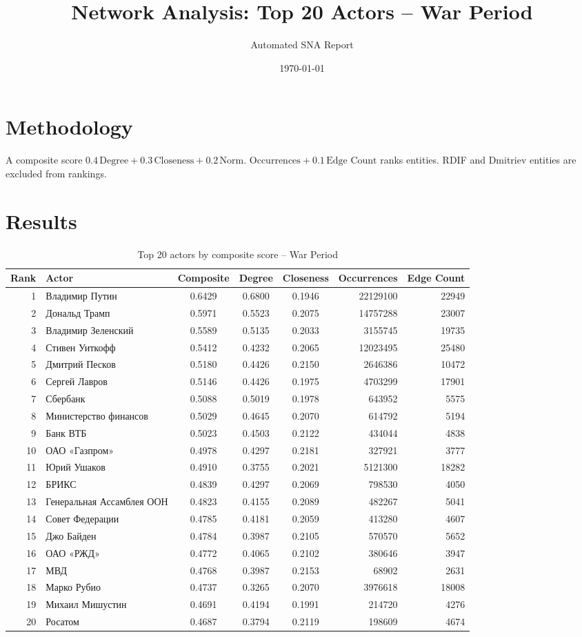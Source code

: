 \documentclass[11pt,a4paper]{article}
\title{Network Analysis: Top 20 Actors -- War Period}
\author{Automated SNA Report}
\date{\today}
\begin{document}
\maketitle
\section{Methodology}
A composite score $0.4\,\text{Degree}+0.3\,\text{Closeness}+0.2\,\text{Norm.\ Occurrences}+0.1\,\text{Edge Count}$ ranks entities. RDIF and Dmitriev entities are excluded from rankings.
\section{Results}
\begin{table}[htbp]
\centering
\caption{Top 20 actors by composite score -- War Period}
\label{tab:top20}
\begin{tabular}{r l S[table-format=1.4] S[table-format=1.4] S[table-format=1.4] r r}
\toprule
Rank & Actor & {Composite} & {Degree} & {Closeness} & Occurrences & {Edge Count}\\
 & Владимир Путин & 0.6429 & 0.6800 & 0.1946 & 22129100 & 22949 \\
2 & Дональд Трамп & 0.5971 & 0.5523 & 0.2075 & 14757288 & 23007 \\
3 & Владимир Зеленский & 0.5589 & 0.5135 & 0.2033 & 3155745 & 19735 \\
4 & Стивен Уиткофф & 0.5412 & 0.4232 & 0.2065 & 12023495 & 25480 \\
5 & Дмитрий Песков & 0.5180 & 0.4426 & 0.2150 & 2646386 & 10472 \\
6 & Сергей Лавров & 0.5146 & 0.4426 & 0.1975 & 4703299 & 17901 \\
7 & Сбербанк & 0.5088 & 0.5019 & 0.1978 & 643952 & 5575 \\
8 & Министерство финансов & 0.5029 & 0.4645 & 0.2070 & 614792 & 5194 \\
9 & Банк ВТБ & 0.5023 & 0.4503 & 0.2122 & 434044 & 4838 \\
10 & ОАО «Газпром» & 0.4978 & 0.4297 & 0.2181 & 327921 & 3777 \\
11 & Юрий Ушаков & 0.4910 & 0.3755 & 0.2021 & 5121300 & 18282 \\
12 & БРИКС & 0.4839 & 0.4297 & 0.2069 & 798530 & 4050 \\
13 & Генеральная Ассамблея ООН & 0.4823 & 0.4155 & 0.2089 & 482267 & 5041 \\
14 & Совет Федерации & 0.4785 & 0.4181 & 0.2059 & 413280 & 4607 \\
15 & Джо Байден & 0.4784 & 0.3987 & 0.2105 & 570570 & 5652 \\
16 & ОАО «РЖД» & 0.4772 & 0.4065 & 0.2102 & 380646 & 3947 \\
17 & МВД & 0.4768 & 0.3987 & 0.2153 & 68902 & 2631 \\
18 & Марко Рубио & 0.4737 & 0.3265 & 0.2070 & 3976618 & 18008 \\
19 & Михаил Мишустин & 0.4691 & 0.4194 & 0.1991 & 214720 & 4276 \\
20 & Росатом & 0.4687 & 0.3794 & 0.2119 & 198609 & 4674 \\\bottomrule
\end{tabular}
\end{table}
\end{document}
